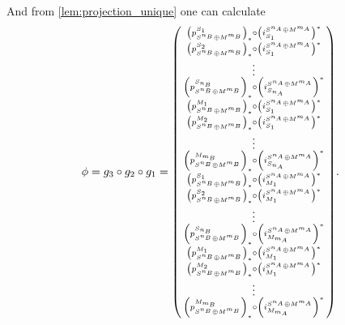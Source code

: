 \begin{remark}
    And from \autoref{lem:projection_unique} one can calculate
    \[
        \phi = g_3 \circ g_2 \circ g_1 =
        \begin{psmallmatrix}
            \left(  p_{S^{n_B} \oplus M^{m_B}}^{S_1}  \right)_* \circ \left(  i_{S_1}^{S^{n_A} \oplus M^{m_A}}  \right)^* \\
            \left(  p_{S^{n_B} \oplus M^{m_B}}^{S_2}  \right)_* \circ \left(  i_{S_1}^{S^{n_A} \oplus M^{m_A}}  \right)^* \\
            \vdots \\
            \left(  p_{S^{n_B} \oplus M^{m_B}}^{S_{n_B}}  \right)_* \circ \left(  i_{S_{n_A}}^{S^{n_A} \oplus M^{m_A}}  \right)^* \\
            \left(  p_{S^{n_B} \oplus M^{m_B}}^{M_1}  \right)_* \circ \left(  i_{S_1}^{S^{n_A} \oplus M^{m_A}}  \right)^* \\
            \left(  p_{S^{n_B} \oplus M^{m_B}}^{M_2}  \right)_* \circ \left(  i_{S_1}^{S^{n_A} \oplus M^{m_A}}  \right)^* \\
            \vdots \\
            \left(  p_{S^{n_B} \oplus M^{m_B}}^{M_{m_B}}  \right)_* \circ \left(  i_{S_{n_A}}^{S^{n_A} \oplus M^{m_A}}  \right)^* \\
            \left(  p_{S^{n_B} \oplus M^{m_B}}^{S_1}  \right)_* \circ \left(  i_{M_1}^{S^{n_A} \oplus M^{m_A}}  \right)^* \\
            \left(  p_{S^{n_B} \oplus M^{m_B}}^{S_2}  \right)_* \circ \left(  i_{M_1}^{S^{n_A} \oplus M^{m_A}}  \right)^* \\
            \vdots \\
            \left(  p_{S^{n_B} \oplus M^{m_B}}^{S_{n_B}}  \right)_* \circ \left(  i_{M_{m_A}}^{S^{n_A} \oplus M^{m_A}}  \right)^* \\
            \left(  p_{S^{n_B} \oplus M^{m_B}}^{M_1}  \right)_* \circ \left(  i_{M_1}^{S^{n_A} \oplus M^{m_A}}  \right)^* \\
            \left(  p_{S^{n_B} \oplus M^{m_B}}^{M_2}  \right)_* \circ \left(  i_{M_1}^{S^{n_A} \oplus M^{m_A}}  \right)^* \\
            \vdots \\
            \left(  p_{S^{n_B} \oplus M^{m_B}}^{M_{m_B}}  \right)_* \circ \left(  i_{M_{m_A}}^{S^{n_A} \oplus M^{m_A}}  \right)^*
        \end{psmallmatrix}.
    \]


\end{remark}
